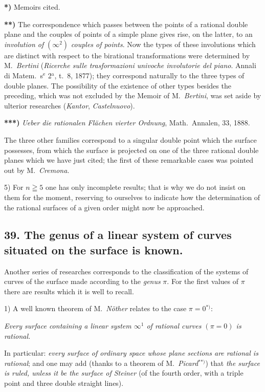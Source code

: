 \documentclass{article}
\begin{document}
\textbf{*)} Memoirs cited.

\textbf{**)} The correspondence which passes between the points of a rational double plane and the couples of points of a simple plane gives rise, on the latter, to an \emph{involution of} $(\infty^{2})$ \emph{couples of points}. Now the types of these involutions which are distinct with respect to the birational transformations were determined by M.\ \emph{Bertini} (\emph{Ricerche sulle trasformazioni univoche involutorie del piano}. Annali di Matem.\ s${}^{\text{e}}$ 2${}^{\text{a}}$, t.\ 8, 1877); they correspond naturally to the three types of double planes. The possibility of the existence of other types besides the preceding, which was not excluded by the Memoir of M.\ \emph{Bertini}, was set aside by ulterior researches (\emph{Kantor}, \emph{Castelnuovo}).

\textbf{***)} \emph{Ueber die rationalen Flächen vierter Ordnung}, Math.\ Annalen, 33, 1888.

The three other families correspond to a singular double point which the surface possesses, from which the surface is projected on one of the three rational double planes which we have just cited; the first of these remarkable cases was pointed out by M.\ \emph{Cremona}.

5) For $n \geqq 5$ one has only incomplete results; that is why we do not insist on them for the moment, reserving to ourselves to indicate how the determination of the rational surfaces of a given order might now be approached.

\subsection*{39. The genus of a linear system of curves situated on the surface is known.}

Another series of researches corresponds to the classification of the systems of curves of the surface made according to the \emph{genus} $\pi$. For the first values of $\pi$ there are results which it is well to recall.

1) A well known theorem of M.\ \emph{Nöther} relates to the case $\pi = 0$${}^{*)}$:

\emph{Every surface containing a linear system $\infty^{1}$ of rational curves $(\pi = 0)$ is rational.}

In particular: \emph{every surface of ordinary space whose plane sections are rational is rational}; and one may add (thanks to a theorem of M.\ \emph{Picard}${}^{**)}$) that \emph{the surface is ruled, unless it be the surface of Steiner} (of the fourth order, with a triple point and three double straight lines).
\end{document}
